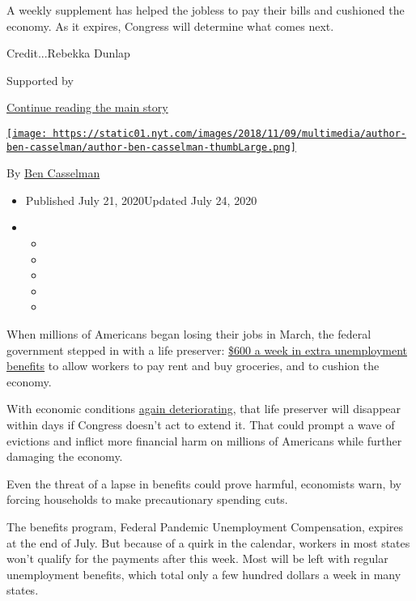 A weekly supplement has helped the jobless to pay their bills and
cushioned the economy. As it expires, Congress will determine what comes
next.

Credit...Rebekka Dunlap

Supported by

\protect\hyperlink{after-sponsor}{Continue reading the main story}

\href{https://www.nytimes.com/by/ben-casselman}{\texttt{[image: https://static01.nyt.com/images/2018/11/09/multimedia/author-ben-casselman/author-ben-casselman-thumbLarge.png]}}

By \href{https://www.nytimes.com/by/ben-casselman}{Ben Casselman}

\begin{itemize}
\item
  Published July 21, 2020Updated July 24, 2020
\item
  \begin{itemize}
  \item
  \item
  \item
  \item
  \item
  \end{itemize}
\end{itemize}

When millions of Americans began losing their jobs in March, the federal
government stepped in with a life preserver:
\href{https://www.nytimes.com/2020/07/30/business/unemployment-payments-change.html}{\$600
a week in extra unemployment benefits} to allow workers to pay rent and
buy groceries, and to cushion the economy.

With economic conditions
\href{https://www.nytimes.com/2020/07/15/business/economy/economic-recovery-coronavirus-resurgence.html}{again
deteriorating}, that life preserver will disappear within days if
Congress doesn't act to extend it. That could prompt a wave of evictions
and inflict more financial harm on millions of Americans while further
damaging the economy.

Even the threat of a lapse in benefits could prove harmful, economists
warn, by forcing households to make precautionary spending cuts.

The benefits program, Federal Pandemic Unemployment Compensation,
expires at the end of July. But because of a quirk in the calendar,
workers in most states won't qualify for the payments after this week.
Most will be left with regular unemployment benefits, which total only a
few hundred dollars a week in many states.

